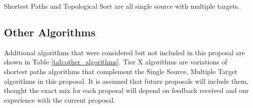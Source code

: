 Shortest Paths and Topological Sort are all single source with multiple targets.

\subsection{Other Algorithms}
Additional algorithms that were considered but not included in this proposal are shown in Table \ref{tab:other_algorithms}. 
Tier X algorithms are variations of shortest paths algorithms that complement the Single Source, Multiple Target algorithms 
in this proposal.
It is assumed that future proposals will include them, thought the exact mix for each proposal will depend on feedback received
and our experience with the current proposal.


